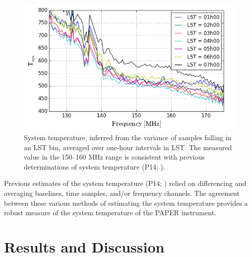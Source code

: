 \documentclass[twocolumn,numberedappendix]{emulateapj} \shorttitle{PSA64}
\begin{document}
\begin{figure}[b!]\centering
\includegraphics[width=\columnwidth]{plots/tsys.png}
\caption{System temperature, inferred from the variance of samples falling 
in an LST bin, averaged over one-hour intervals in LST.  The measured value
in the 150--160 MHz range is consistent with previous determinations of
system temperature (P14; \citealt{jacobs_et_al2014}).
}\label{fig:tsys}
\end{figure}
Previous estimates of the system temperature
(P14; \citealt{jacobs_et_al2014}) relied on differencing and averaging
baselines, time samples, and/or frequency channels. The agreement between these
various methods of estimating the system temperature provides a robust measure
of the system temperature of the PAPER instrument. 


\section{Results and Discussion}\label{sec:results}
\end{document}
